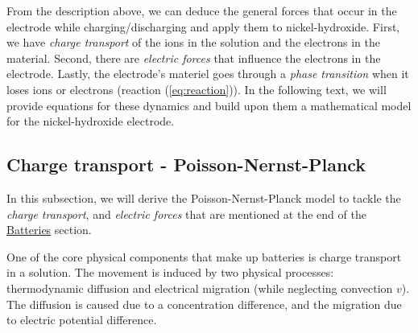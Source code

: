 \documentclass[12pt]{article}
\begin{document}
From the description above, we can deduce the general forces that occur in the electrode while charging/discharging and apply them to nickel-hydroxide. First, we have \textit{charge transport} of the ions in the solution and the electrons in the material. Second, there are \textit{electric forces} that influence the electrons in the electrode. Lastly, the electrode's materiel goes through a \textit{phase transition} when it loses ions or electrons (reaction (\ref{eq:reaction})). In the following text, we will provide equations for these dynamics and build upon them a mathematical model for the nickel-hydroxide electrode.


\subsection{Charge transport - Poisson-Nernst-Planck} \label{sec:pnp}
 In this subsection, we will derive the Poisson-Nernst-Planck model to tackle the \textit{charge transport}, and \textit{electric forces} that are mentioned at the end of the \hyperref[sec:batt]{Batteries} section.
 
 One of the core physical components that make up batteries is charge transport in a solution. The movement is induced by two physical processes: thermodynamic diffusion and electrical migration (while neglecting convection $v$). The diffusion is caused due to a concentration difference, and the migration due to electric potential difference.
\end{document}
